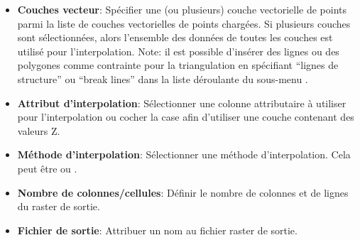 \begin{itemize}
\item \textbf{Couches vecteur}: Spécifier une (ou plusieurs) couche 
vectorielle de points parmi la liste de couches vectorielles de points 
chargées. Si plusieurs couches sont sélectionnées, alors l'ensemble des 
données de toutes les couches est utilisé pour l'interpolation. 
Note: il est possible d'insérer des lignes ou des polygones comme contrainte 
pour la triangulation en spécifiant ``lignes de structure'' ou ``break lines'' 
dans la liste déroulante du sous-menu .
\item \textbf{Attribut d'interpolation}: Sélectionner une colonne 
attributaire à utiliser pour l'interpolation ou cocher la case 
 afin d'utiliser une
couche contenant des valeurs Z.
\item \textbf{Méthode d'interpolation}: Sélectionner une méthode 
d'interpolation. Cela peut être  
ou .
\item \textbf{Nombre de colonnes/cellules}: Définir le nombre de colonnes et 
de lignes du raster de sortie.
\item \textbf{Fichier de sortie}: Attribuer un nom au fichier raster de 
sortie.
\end{itemize}


